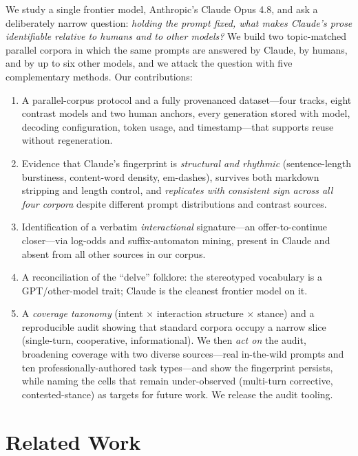 \documentclass[11pt]{article}
\begin{document}
We study a single frontier model, Anthropic's Claude Opus 4.8, and ask a
deliberately narrow question: \emph{holding the prompt fixed, what makes Claude's
prose identifiable relative to humans and to other models?} We build two
topic-matched parallel corpora in which the same prompts are answered by Claude,
by humans, and by up to six other models, and we attack the question with five
complementary methods. Our contributions:
\begin{enumerate}
  \itemsep0em
  \item A parallel-corpus protocol and a fully provenanced dataset---four tracks,
    eight contrast models and two human anchors, every generation stored with
    model, decoding configuration, token usage, and timestamp---that supports
    reuse without regeneration.
  \item Evidence that Claude's fingerprint is \emph{structural and rhythmic}
    (sentence-length burstiness, content-word density, em-dashes), survives both
    markdown stripping and length control, and \emph{replicates with consistent
    sign across all four corpora} despite different prompt distributions and
    contrast sources.
  \item Identification of a verbatim \emph{interactional} signature---an
    offer-to-continue closer---via log-odds and suffix-automaton mining, present
    in Claude and absent from all other sources in our corpus.
  \item A reconciliation of the ``delve'' folklore: the stereotyped vocabulary
    is a GPT/other-model trait; Claude is the cleanest frontier model on it.
  \item A \emph{coverage taxonomy} (intent $\times$ interaction structure $\times$
    stance) and a reproducible audit showing that standard corpora occupy a
    narrow slice (single-turn, cooperative, informational). We then \emph{act on}
    the audit, broadening coverage with two diverse sources---real in-the-wild
    prompts and ten professionally-authored task types---and show the fingerprint
    persists, while naming the cells that remain under-observed (multi-turn
    corrective, contested-stance) as targets for future work. We release the audit
    tooling.
\end{enumerate}

\section{Related Work}
\label{sec:related}
\end{document}
